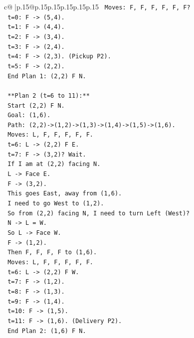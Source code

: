 \documentclass{article}
\begin{document}
{\begin{supertabular}{c@{$\;$}|p{.15\linewidth}@{}p{.15\linewidth}p{.15\linewidth}p{.15\linewidth}p{.15\linewidth}p{.15\linewidth}}
{{{\texttt{    Moves: F, F, F, F, F, F?} \\
\texttt{    t=0: F {-}> (5,4).} \\
\texttt{    t=1: F {-}> (4,4).} \\
\texttt{    t=2: F {-}> (3,4).} \\
\texttt{    t=3: F {-}> (2,4).} \\
\texttt{    t=4: F {-}> (2,3). (Pickup P2).} \\
\texttt{    t=5: F {-}> (2,2).} \\
\texttt{    End Plan 1: (2,2) F N.} \\
\\ 
\texttt{    **Plan 2 (t=6 to 11):**} \\
\texttt{    Start (2,2) F N.} \\
\texttt{    Goal: (1,6).} \\
\texttt{    Path: (2,2){-}>(1,2){-}>(1,3){-}>(1,4){-}>(1,5){-}>(1,6).} \\
\texttt{    Moves: L, F, F, F, F, F.} \\
\texttt{    t=6: L {-}> (2,2) F E.} \\
\texttt{    t=7: F {-}> (3,2)? Wait.} \\
\texttt{    If I am at (2,2) facing N.} \\
\texttt{    L {-}> Face E.} \\
\texttt{    F {-}> (3,2).} \\
\texttt{    This goes East, away from (1,6).} \\
\texttt{    I need to go West to (1,2).} \\
\texttt{    So from (2,2) facing N, I need to turn Left (West)?} \\
\texttt{    N {-}> L = W.} \\
\texttt{    So L {-}> Face W.} \\
\texttt{    F {-}> (1,2).} \\
\texttt{    Then F, F, F, F to (1,6).} \\
\texttt{    Moves: L, F, F, F, F, F.} \\
\texttt{    t=6: L {-}> (2,2) F W.} \\
\texttt{    t=7: F {-}> (1,2).} \\
\texttt{    t=8: F {-}> (1,3).} \\
\texttt{    t=9: F {-}> (1,4).} \\
\texttt{    t=10: F {-}> (1,5).} \\
\texttt{    t=11: F {-}> (1,6). (Delivery P2).} \\
\texttt{    End Plan 2: (1,6) F N.} \\
}}}
\end{supertabular}}
\end{document}
